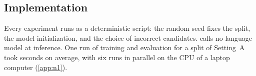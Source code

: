 \subsection{Implementation}\label{sec:impl}

Every experiment runs as a deterministic script: the random seed fixes the split, the model
initialization, and the choice of incorrect candidates. \ours{} calls no language model
at inference. One run of training and evaluation for a split of Setting~A took \TimeRunA{} seconds on
average, with six runs in parallel on the CPU of a laptop computer (\ref{app:n1}).
